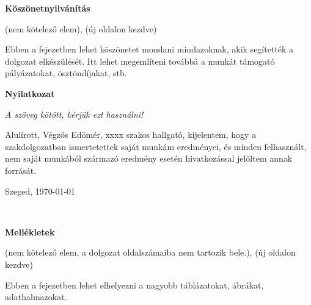 \documentclass[a4paper,12pt]{report}
\theoremstyle{definition}
\theoremstyle{remark}
\begin{document}
\newpage
{\Huge \bf Köszönetnyilvánítás}


\vspace{2 cm}

(nem kötelező elem), (új oldalon kezdve) 

Ebben a fejezetben lehet köszönetet mondani mindazoknak, akik segítették a dolgozat elkészülését. Itt lehet megemlíteni továbbá a munkát támogató pályázatokat, ösztöndíjakat, stb.

\newpage
{\Huge \bf Nyilatkozat}


\vspace{2 cm}

{\it A szöveg kötött, kérjük ezt használni!}

Alulírott, Végzős Edömér, xxxx szakos hallgató, kijelentem, hogy a szakdolgozatban ismertetettek saját munkám eredményei, és minden felhasznált, nem saját munkából származó eredmény esetén hivatkozással jelöltem annak forrását. 


\begin{flushleft}
\vspace*{1cm}
Szeged, \today
\end{flushleft}

\begin{flushright}
 \vspace*{1cm}
 \makebox[7cm]{\rule{6cm}{.4pt}}\\
\end{flushright}

\pagebreak

\newpage
{\Huge \bf Mellékletek}


\vspace{2 cm}

(nem kötelező elem, a dolgozat oldalszámaiba nem tartozik bele.), (új oldalon kezdve)

Ebben a fejezetben lehet elhelyezni a nagyobb táblázatokat, ábrákat, adathalmazokat.
\end{document}
